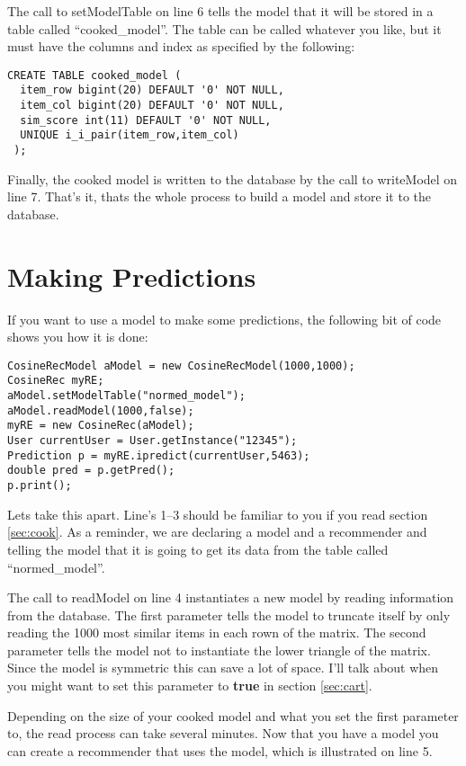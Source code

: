 \documentclass[12pt]{article}
\begin{document}
The call to setModelTable on line 6 tells the model that it will be
stored in a table called ``cooked\_model''.  The table can be called
whatever you like, but it must have the columns and index as specified
by the following:

\begin{lstlisting}
CREATE TABLE cooked_model (
  item_row bigint(20) DEFAULT '0' NOT NULL,
  item_col bigint(20) DEFAULT '0' NOT NULL,
  sim_score int(11) DEFAULT '0' NOT NULL,
  UNIQUE i_i_pair(item_row,item_col)
 );
\end{lstlisting}

Finally, the cooked model is written to the database by the call to
writeModel on line 7.  That's it, thats the whole process to build a
model and store it to the database.

\section{Making Predictions}
\label{sec:pred}

If you want to use a model to make some predictions, the following bit
of code shows you how it is done:
\lstset{language=Java}
\begin{lstlisting}
CosineRecModel aModel = new CosineRecModel(1000,1000);
CosineRec myRE;
aModel.setModelTable("normed_model");
aModel.readModel(1000,false);
myRE = new CosineRec(aModel);
User currentUser = User.getInstance("12345");
Prediction p = myRE.ipredict(currentUser,5463);
double pred = p.getPred();
p.print();
\end{lstlisting}

Lets take this apart. Line's 1--3 should be familiar to you if you
read section \ref{sec:cook}.  As a reminder, we are declaring a model
and a recommender and telling the model that it is going to get its
data from the table called ``normed\_model''.

The call to readModel on line 4 instantiates a new model by reading
information from the database.  The first parameter tells the model to
truncate itself by only reading the 1000 most similar items in
each rown of the matrix.  The second parameter tells the model not to
instantiate the lower triangle of the matrix.  Since the model is
symmetric this can save a lot of space. I'll talk about when you might
want to set this parameter to \textbf{true} in section \ref{sec:cart}.

Depending on the size of your cooked model and what you set the first
parameter to, the read process can take several minutes.  Now that you
have a model you can create a recommender that uses the model, which
is illustrated on line 5.
\end{document}
